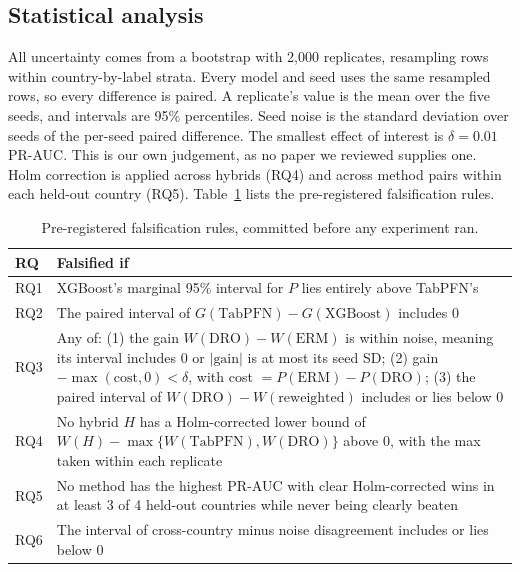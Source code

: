 \documentclass[11pt]{article}
\begin{document}
\subsection{Statistical analysis}

All uncertainty comes from a bootstrap with 2,000 replicates, resampling rows within country-by-label strata. Every model and seed uses the same resampled rows, so every difference is paired. A replicate's value is the mean over the five seeds, and intervals are 95\% percentiles. Seed noise is the standard deviation over seeds of the per-seed paired difference. The smallest effect of interest is $\delta = 0.01$ PR-AUC. This is our own judgement, as no paper we reviewed supplies one. Holm correction is applied across hybrids (RQ4) and across method pairs within each held-out country (RQ5). Table~\ref{tab:rules} lists the pre-registered falsification rules.

\begin{table}[H]
  \centering
  \small
  \caption{Pre-registered falsification rules, committed before any experiment ran.}
  \label{tab:rules}
  \begin{tabular}{p{}p{}}
    \toprule
    RQ & Falsified if \\
    \midrule
    RQ1 & XGBoost's marginal 95\% interval for $P$ lies entirely above TabPFN's \\
    RQ2 & The paired interval of $G(\text{TabPFN}) - G(\text{XGBoost})$ includes 0 \\
    RQ3 & Any of: (1) the gain $W(\text{DRO}) - W(\text{ERM})$ is within noise, meaning its interval includes 0 or $|\text{gain}|$ is at most its seed SD; (2) gain $-\max(\text{cost}, 0) < \delta$, with cost $= P(\text{ERM}) - P(\text{DRO})$; (3) the paired interval of $W(\text{DRO}) - W(\text{reweighted})$ includes or lies below 0 \\
    RQ4 & No hybrid $H$ has a Holm-corrected lower bound of $W(H) - \max\{W(\text{TabPFN}), W(\text{DRO})\}$ above 0, with the max taken within each replicate \\
    RQ5 & No method has the highest PR-AUC with clear Holm-corrected wins in at least 3 of 4 held-out countries while never being clearly beaten \\
    RQ6 & The interval of cross-country minus noise disagreement includes or lies below 0 \\
    \bottomrule
  \end{tabular}
\end{table}
\end{document}
